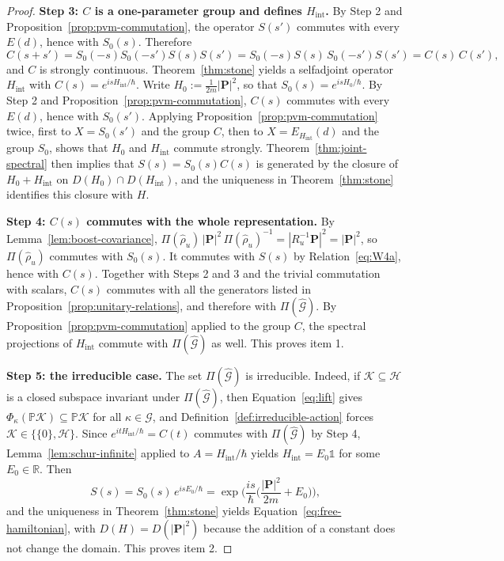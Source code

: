\begin{proof}
	\medskip
	\noindent\textbf{Step 3: $C$ is a one-parameter group and defines $H_{\mathrm{int}}$.} By Step 2 and Proposition~\ref{prop:pvm-commutation}, the operator $S(s')$ commutes with every $E(d)$, hence with $S_0(s)$. Therefore
	\begin{equation*}
		C(s+s')=S_0(-s)S_0(-s')S(s)S(s')=S_0(-s)S(s)\,S_0(-s')S(s')=C(s)\,C(s'),
	\end{equation*}
	and $C$ is strongly continuous. Theorem~\ref{thm:stone} yields a selfadjoint operator $H_{\mathrm{int}}$ with $C(s)=e^{isH_{\mathrm{int}}/\hbar}$. Write $H_0:=\frac{1}{2m}|\mathbf{P}|^2$, so that $S_0(s)=e^{isH_0/\hbar}$. By Step 2 and Proposition~\ref{prop:pvm-commutation}, $C(s)$ commutes with every $E(d)$, hence with $S_0(s')$. Applying Proposition~\ref{prop:pvm-commutation} twice, first to $X=S_0(s')$ and the group $C$, then to $X=E_{H_{\mathrm{int}}}(d)$ and the group $S_0$, shows that $H_0$ and $H_{\mathrm{int}}$ commute strongly. Theorem~\ref{thm:joint-spectral} then implies that $S(s)=S_0(s)C(s)$ is generated by the closure of $H_0+H_{\mathrm{int}}$ on $D(H_0)\cap D(H_{\mathrm{int}})$, and the uniqueness in Theorem~\ref{thm:stone} identifies this closure with $H$.
	
	\medskip
	\noindent\textbf{Step 4: $C(s)$ commutes with the whole representation.} By Lemma~\ref{lem:boost-covariance}, $\Pi(\hat\rho_u)\,|\mathbf{P}|^2\,\Pi(\hat\rho_u)^{-1}=|R_u^{-1}\mathbf{P}|^2=|\mathbf{P}|^2$, so $\Pi(\hat\rho_u)$ commutes with $S_0(s)$. It commutes with $S(s)$ by Relation~\eqref{eq:W4a}, hence with $C(s)$. Together with Steps 2 and 3 and the trivial commutation with scalars, $C(s)$ commutes with all the generators listed in Proposition~\ref{prop:unitary-relations}, and therefore with $\Pi(\widehat{\mathcal{G}})$. By Proposition~\ref{prop:pvm-commutation} applied to the group $C$, the spectral projections of $H_{\mathrm{int}}$ commute with $\Pi(\widehat{\mathcal{G}})$ as well. This proves item 1.
	
	\medskip
	\noindent\textbf{Step 5: the irreducible case.} The set $\Pi(\widehat{\mathcal{G}})$ is irreducible. Indeed, if $\mathcal{K}\subseteq\mathcal{H}$ is a closed subspace invariant under $\Pi(\widehat{\mathcal{G}})$, then Equation~\eqref{eq:lift} gives $\Phi_\kappa(\mathbb{P}\mathcal{K})\subseteq\mathbb{P}\mathcal{K}$ for all $\kappa\in\mathcal{G}$, and Definition~\ref{def:irreducible-action} forces $\mathcal{K}\in\{\{0\},\mathcal{H}\}$. Since $e^{itH_{\mathrm{int}}/\hbar}=C(t)$ commutes with $\Pi(\widehat{\mathcal{G}})$ by Step 4, Lemma~\ref{lem:schur-infinite} applied to $A=H_{\mathrm{int}}/\hbar$ yields $H_{\mathrm{int}}=E_0\mathbb{1}$ for some $E_0\in\mathbb{R}$. Then
	\begin{equation*}
		S(s)=S_0(s)\,e^{isE_0/\hbar}=\exp\!\Big(\frac{is}{\hbar}\Big(\frac{|\mathbf{P}|^2}{2m}+E_0\Big)\Big),
	\end{equation*}
	and the uniqueness in Theorem~\ref{thm:stone} yields Equation~\eqref{eq:free-hamiltonian}, with $D(H)=D(|\mathbf{P}|^2)$ because the addition of a constant does not change the domain. This proves item 2.
	

\end{proof}
